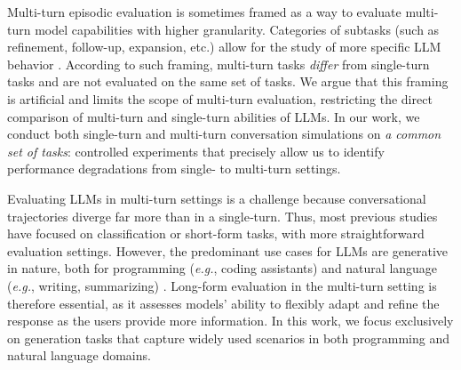 \documentclass{article}
\begin{document}
Multi-turn episodic evaluation is sometimes framed as a way to evaluate multi-turn model capabilities with higher granularity.
Categories of subtasks (such as refinement, follow-up, expansion, etc.) allow for the study of more specific LLM behavior \cite{bai2024mt, kwan2024mt,sun2024parrot,fan2024fairmt,deng2024multi,liang2024mathchat,han2025can}.
According to such framing, multi-turn tasks \textit{differ} from single-turn tasks and are not evaluated on the same set of tasks.
We argue that this framing is artificial and limits the scope of multi-turn evaluation, restricting the direct comparison of multi-turn and single-turn abilities of LLMs.
In our work, we conduct both single-turn and multi-turn conversation simulations on \textit{a common set of tasks}: controlled experiments that precisely allow us to identify performance degradations from single- to multi-turn settings.

Evaluating LLMs in multi-turn settings is a challenge because conversational trajectories diverge far more than in a single‑turn.
Thus, most previous studies have focused on classification or short-form tasks, with more straightforward evaluation settings.
However, the predominant use cases for LLMs are generative in nature, both for programming (\textit{e.g.}, coding assistants) and natural language (\textit{e.g.}, writing, summarizing) \cite{zheng2023lmsys,handa2025economic}.
Long-form evaluation in the multi-turn setting is therefore essential, as it assesses models' ability to flexibly adapt and refine the response as the users provide more information.
In this work, we focus exclusively on generation tasks that capture widely used scenarios in both programming and natural language domains.

\end{document}
